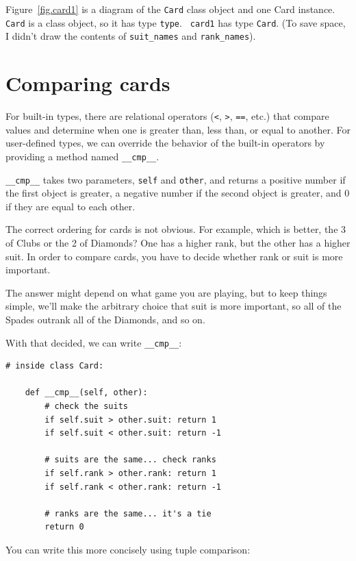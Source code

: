 \documentclass[12pt,a4paper,final,twoside,onecolumn,titlepage]{book}
\begin{document}
Figure~\ref{fig.card1} is a diagram of the {\tt Card} class object
and one Card instance.
{\tt Card} is a class object, so it has type {\tt type}.  {\tt
card1} has type {\tt Card}.  (To save space, I didn't draw the
contents of \verb"suit_names" and \verb"rank_names").


\section{Comparing cards}
\label{comparecard}

For built-in types, there are relational operators
({\tt <}, {\tt >}, {\tt ==}, etc.)
that compare
values and determine when one is greater than, less than, or equal to
another.  For user-defined types, we can override the behavior of
the built-in operators by providing a method named
\verb"__cmp__".  

\verb"__cmp__" takes two parameters, {\tt self} and {\tt other},
and returns a positive number if the first object is greater, a
negative number if the second object is greater, and 0 if they are
equal to each other.

The correct ordering for cards is not obvious.
For example, which
is better, the 3 of Clubs or the 2 of Diamonds?  One has a higher
rank, but the other has a higher suit.  In order to compare
cards, you have to decide whether rank or suit is more important.

The answer might depend on what game you are playing, but to keep
things simple, we'll make the arbitrary choice that suit is more
important, so all of the Spades outrank all of the Diamonds,
and so on.

With that decided, we can write \verb"__cmp__":

\begin{verbatim}
# inside class Card:

    def __cmp__(self, other):
        # check the suits
        if self.suit > other.suit: return 1
        if self.suit < other.suit: return -1

        # suits are the same... check ranks
        if self.rank > other.rank: return 1
        if self.rank < other.rank: return -1

        # ranks are the same... it's a tie
        return 0    
\end{verbatim}
%
You can write this more concisely using tuple comparison:
\end{document}
